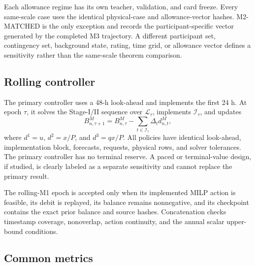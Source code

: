 \documentclass[10pt,journal,onecolumn]{IEEEtran}
\begin{document}
Each allowance regime has its own teacher, validation, and card freeze. Every
same-scale case uses the identical physical-case and allowance-vector hashes.
M2-MATCHED is the only exception and records the participant-specific vector
generated by the completed M3 trajectory. A different participant set,
contingency set, background state, rating, time grid, or allowance vector defines
a sensitivity rather than the same-scale theorem comparison.

\subsection{Rolling controller}

The primary controller uses a 48-h look-ahead and implements the first 24 h.
At epoch $\tau$, it solves the Stage-I/II sequence over
$\mathcal L_\tau$, implements $\mathcal I_\tau$, and updates
\begin{equation}
B_{n,\tau+1}^M
=B_{n,\tau}^M-
\sum_{t\in\mathcal I_\tau}\Delta_t d_{n,t}^M,
\end{equation}
where $d^1=u$, $d^2=x/P$, and $d^3=qx/P$. All policies have identical
look-ahead, implementation block, forecasts, requests, physical rows, and
solver tolerances. The primary controller has no terminal reserve. A paced or
terminal-value design, if studied, is clearly labeled as a separate
sensitivity and cannot replace the primary result.

The rolling-M1 epoch is accepted only when its implemented MILP action is
feasible, its debit is replayed, its balance remains nonnegative, and its
checkpoint contains the exact prior balance and source hashes. Concatenation
checks timestamp coverage, nonoverlap, action continuity, and the annual scalar
upper-bound conditions.

\subsection{Common metrics}
\end{document}
